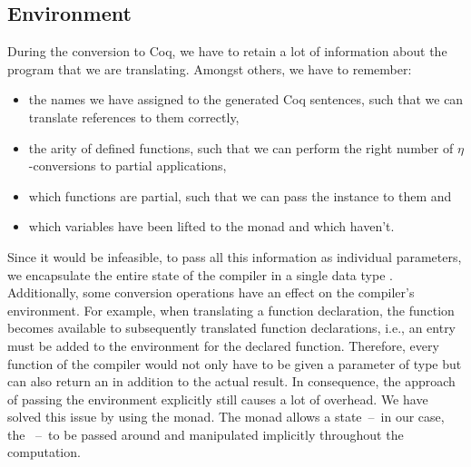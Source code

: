 \subsection{Environment} \label{sec:implementation:conversion:environment}
During the conversion to Coq, we have to retain a lot of information about the program that we are translating.
Amongst others, we have to remember:
\begin{itemize}
  \item the names we have assigned to the generated Coq sentences, such that we can translate references to them correctly,
  \item the arity of defined functions, such that we can perform the right number of $\eta$-conversions to partial applications,
  \item which functions are partial, such that we can pass the  instance to them and
  \item which variables have been lifted to the  monad and which haven't.
\end{itemize}
Since it would be infeasible, to pass all this information as individual parameters, we encapsulate the entire state of the compiler in a single data type .
Additionally, some conversion operations have an effect on the compiler's environment.
For example, when translating a function declaration, the function becomes available to subsequently translated function declarations, i.e., an entry must be added to the environment for the declared function.
Therefore, every function of the compiler would not only have to be given a parameter of type  but can also return an  in addition to the actual result.
In consequence, the approach of passing the environment explicitly still causes a lot of overhead.
We have solved this issue by using the  monad.
The  monad allows a state~--~in our case, the ~--~to be passed around and manipulated implicitly throughout the computation.


